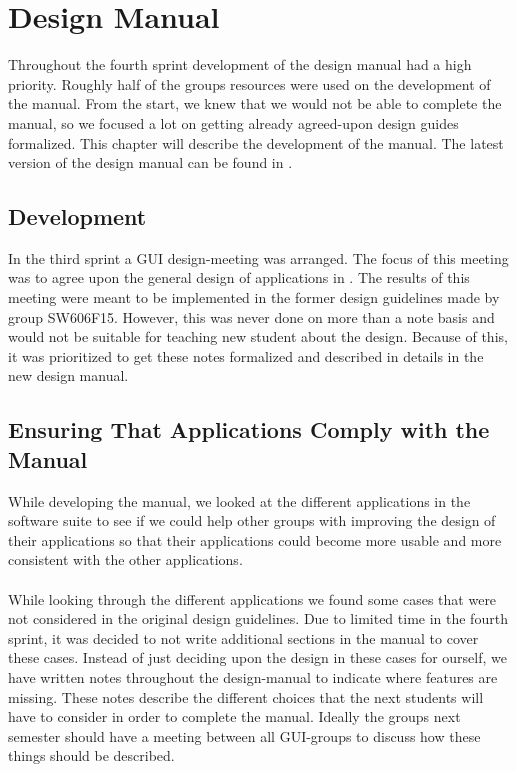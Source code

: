
\chapter{Design Manual}
\label{cha:design_manual}

Throughout the fourth sprint development of the design manual had a high priority. Roughly half of the groups resources were used on the development of the manual. From the start, we knew that we would not be able to complete the manual, so we focused a lot on getting already agreed-upon design guides formalized. This chapter will describe the development of the manual. The latest version of the design manual can be found in .

\section{Development}
\label{sec:development}
In the third sprint a GUI design-meeting was arranged. The focus of this meeting was to agree upon the general design of applications in \giraf. The results of this meeting were meant to be implemented in the former design guidelines made by group SW606F15. However, this was never done on more than a note basis and would not be suitable for teaching new student about the design. Because of this, it was prioritized to get these notes formalized and described in details in the new design manual. 

\section{Ensuring That Applications Comply with the Manual}
\label{sec:ensuring_that_applications_comply_with_the_manual}
While developing the manual, we looked at the different applications in the \giraf software suite to see if we could help other groups with improving the design of their applications so that their applications could become more usable and more consistent with the other applications. 
\\\\
While looking through the different applications we found some cases that were not considered in the original design guidelines. Due to limited time in the fourth sprint, it was decided to not write additional sections in the manual to cover these cases. Instead of just deciding upon the design in these cases for ourself, we have written notes throughout the design-manual to indicate where features are missing. These notes describe the different choices that the next students will have to consider in order to complete the manual. Ideally the groups next semester should have a meeting between all GUI-groups to discuss how these things should be described.